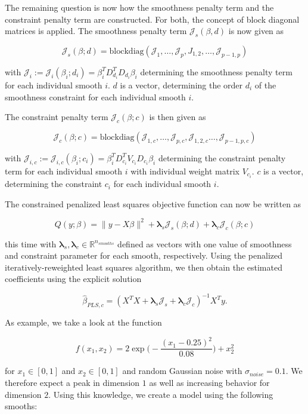 \documentclass[10pt,a4paper]{article}
\begin{document}
	The remaining question is now how the smoothness penalty term and the constraint penalty term are constructed. For both, the concept of block diagonal matrices is applied. The smoothness penalty term $\mathcal J_s(\beta, d)$ is now given as
	
	$$\mathcal J_s(\beta; d) = \text{blockdiag}(\mathcal J_1, \dots, \mathcal J_p, J_{1,2}, \dots, \mathcal J_{p-1,p}) $$
	
	with $\mathcal J_i := \mathcal J_i(\beta_i; d_i) = \beta_i^T D_{d_i}^T D_{d_i} \beta_i$ determining the smoothness penalty term for each individual smooth $i$. $d$ is a vector, determining the order $d_i$ of the smoothness constraint for each individual smooth $i$. 
	
	The constraint penalty term $\mathcal J_c(\beta; c)$ is then given as
	
	$$\mathcal J_c(\beta; c) = \text{blockdiag}(\mathcal J_{1,c}, \dots, \mathcal J_{p,c}, \mathcal J_{1,2,c} \dots, \mathcal J_{p-1,p,c})$$
	
	with $\mathcal J_{i,c} := \mathcal J_{i,c}(\beta_i; c_i) = \beta_i^T D_{c_i}^T V_{c_i} D_{c_i} \beta_i$ determining the constraint penalty term for each individual smooth $i$ with individual weight matrix $V_{c_i}$. $c$ is a vector, determining the constraint $c_i$ for each individual smooth $i$. 
	
	The constrained penalized least squares objective function can now be written as
	
	$$Q(y; \beta) = \lVert y - X\beta \rVert^2 + \boldsymbol \lambda_s \mathcal J_s(\beta; d) + \boldsymbol \lambda_c \mathcal J_c(\beta; c) $$
	
	this time with $\boldsymbol \lambda_s, \boldsymbol \lambda_c \in \mathbb{R}^{n_{smooths}}$  defined as vectors with one value of smoothness and constraint parameter for each smooth, respectively. Using the penalized iteratively-reweighted least squares algorithm, we then obtain the estimated coefficients using the explicit solution
	
	$$\hat \beta_{PLS,c} = (X^TX + \boldsymbol \lambda_s \mathcal J_s  + \boldsymbol \lambda_c \mathcal J_c)^{-1} X^T y.$$
	
	As example, we take a look at the function 
	
	$$f(x_1, x_2) = 2\exp{\big(-\frac{(x_1 - 0.25)^2}{0.08}\big)} + x_2^2 $$
	
	for $x_1 \in [0,1]$ and $x_2 \in [0,1]$ and random Gaussian noise with $\sigma_{noise} = 0.1$. We therefore expect a peak in dimension $1$ as well as increasing behavior for dimension $2$. Using this knowledge, we create a model using the following smooths:
	
\end{document}
